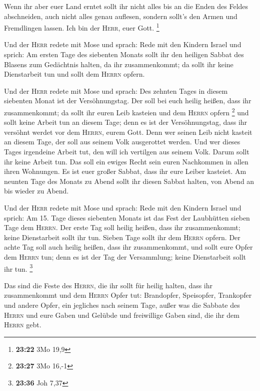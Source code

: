  Wenn ihr aber euer Land erntet sollt ihr nicht alles bis
an die Enden des Feldes abschneiden, auch nicht alles genau auflesen,
sondern sollt's den Armen und Fremdlingen lassen. Ich bin der
\textsc{Herr}, euer Gott. \footnote{\textbf{23:22} 3Mo 19,9}

 Und der \textsc{Herr} redete mit Mose und sprach:
 Rede mit den Kindern Israel und sprich: Am ersten Tage
des siebenten Monats sollt ihr den heiligen Sabbat des Blasens zum
Gedächtnis halten, da ihr zusammenkommt;  da sollt ihr
keine Dienstarbeit tun und sollt dem \textsc{Herrn} opfern.

 Und der \textsc{Herr} redete mit Mose und sprach:
 Des zehnten Tages in diesem siebenten Monat ist der
Versöhnungstag. Der soll bei euch heilig heißen, dass ihr zusammenkommt;
da sollt ihr euren Leib kasteien und dem \textsc{Herrn} opfern
\footnote{\textbf{23:27} 3Mo 16,-1}  und sollt keine
Arbeit tun an diesem Tage; denn es ist der Versöhnungstag, dass ihr
versöhnt werdet vor dem \textsc{Herrn}, eurem Gott.  Denn
wer seinen Leib nicht kasteit an diesem Tage, der soll aus seinem Volk
ausgerottet werden.  Und wer dieses Tages irgendeine
Arbeit tut, den will ich vertilgen aus seinem Volk. 
Darum sollt ihr keine Arbeit tun. Das soll ein ewiges Recht sein euren
Nachkommen in allen ihren Wohnungen.  Es ist euer großer
Sabbat, dass ihr eure Leiber kasteiet. Am neunten Tage des Monats zu
Abend sollt ihr diesen Sabbat halten, von Abend an bis wieder zu Abend.

 Und der \textsc{Herr} redete mit Mose und sprach:
 Rede mit den Kindern Israel und sprich: Am 15. Tage
dieses siebenten Monats ist das Fest der Laubhütten sieben Tage dem
\textsc{Herrn}.  Der erste Tag soll heilig heißen, dass
ihr zusammenkommt; keine Dienstarbeit sollt ihr tun. 
Sieben Tage sollt ihr dem \textsc{Herrn} opfern. Der achte Tag soll auch
heilig heißen, dass ihr zusammenkommt, und sollt eure Opfer dem
\textsc{Herrn} tun; denn es ist der Tag der Versammlung; keine
Dienstarbeit sollt ihr tun. \footnote{\textbf{23:36} Joh 7,37}

 Das sind die Feste des \textsc{Herrn}, die ihr sollt für
heilig halten, dass ihr zusammenkommt und dem \textsc{Herrn} Opfer tut:
Brandopfer, Speisopfer, Trankopfer und andere Opfer, ein jegliches nach
seinem Tage,  außer was die Sabbate des \textsc{Herrn}
und eure Gaben und Gelübde und freiwillige Gaben sind, die ihr dem
\textsc{Herrn} gebt.

